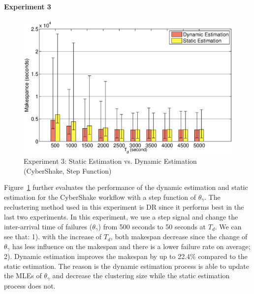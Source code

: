 \paragraph{\textbf{Experiment 3}}
\begin{figure}[!htb]
\centering
  \includegraphics[width=1\linewidth]{figures/tolerance/versus.eps}
  \caption{Experiment 3: Static Estimation vs. Dynamic Estimation (CyberShake, Step Function)}
  \label{fig:expr_static_dynamic}
\end{figure}

Figure~\ref{fig:expr_static_dynamic} further evaluates the performance of the dynamic estimation and static estimation for the CyberShake workflow with a step function of $\theta_{\gamma}$. The reclustering method used in this experiment is DR since it performs best in the last two experiments. In this experiment, we use a step signal and change the inter-arrival time of failures ($\theta_{\gamma}$) from 500 seconds to 50 seconds at $T_d$. We can see that: 1). with the increase of $T_d$, both makespan decrease since the change of  $\theta_{\gamma}$ has less influence on the makespan and there is a lower failure rate on average; 2). Dynamic estimation improves the makespan by up to 22.4\% compared to the static estimation. The reason is the dynamic estimation process is able to update the MLEs of $\theta_{\gamma}$ and decrease the clustering size while the static estimation process does not. 

